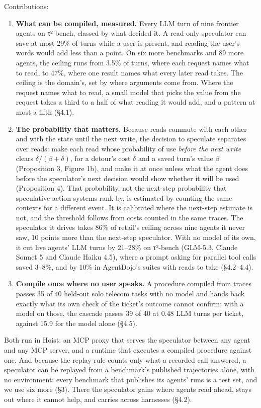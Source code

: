 \documentclass[10pt,twocolumn,letterpaper]{article}
\providecommand{\tightlist}{\setlength{\itemsep}{0pt}\setlength{\parskip}{0pt}}
\newcommand{\runin}[1]{{\sffamily\bfseries\color{accent}#1}}
\begin{document}
Contributions:

\begin{enumerate}
\def\labelenumi{\arabic{enumi}.}
\tightlist
\item
  \runin{What can be compiled, measured.} Every LLM turn of nine frontier agents on τ²-bench, classed by what decided it. A read-only speculator can save at most 29\% of turns while a user is present, and reading the user's words would add less than a point. On six more benchmarks and 89 more agents, the ceiling runs from 3.5\% of turns, where each request names what to read, to 47\%, where one result names what every later read takes. The ceiling is the domain's, set by where arguments come from. Where the request names what to read, a small model that picks the value from the request takes a third to a half of what reading it would add, and a pattern at most a fifth (§4.1).
\item
  \runin{The probability that matters.} Because reads commute with each other and with the state until the next write, the decision to speculate separates over reads: make each read whose probability of use \emph{before the next write} clears \(\delta/(\beta+\delta)\), for a detour's cost \(\delta\) and a saved turn's value \(\beta\) (Proposition 3, Figure 1b), and make it at once unless what the agent does before the speculator's next decision would show whether it will be used (Proposition 4). That probability, not the next-step probability that speculative-action systems rank by, is estimated by counting the same contexts for a different event. It is calibrated where the next-step estimate is not, and the threshold follows from costs counted in the same traces. The speculator it drives takes 86\% of retail's ceiling across nine agents it never saw, 10 points more than the next-step speculator. With no model of its own, it cut live agents' LLM turns by 21--28\% on τ²-bench (GLM-5.3, Claude Sonnet 5 and Claude Haiku 4.5), where a prompt asking for parallel tool calls saved 3--8\%, and by 10\% in AgentDojo's suites with reads to take (§4.2--4.4).
\item
  \runin{Compile once where no user speaks.} A procedure compiled from traces passes 35 of 40 held-out solo telecom tasks with no model and hands back exactly what its own check of the ticket's outcome cannot confirm; with a model on those, the cascade passes 39 of 40 at 0.48 LLM turns per ticket, against 15.9 for the model alone (§4.5).
\end{enumerate}

Both run in Hoist: an MCP proxy that serves the speculator between any agent and any MCP server, and a runtime that executes a compiled procedure against one. And because the replay rule counts only what a recorded call answered, a speculator can be replayed from a benchmark's published trajectories alone, with no environment: every benchmark that publishes its agents' runs is a test set, and we use six more (§3). There the speculator gains where agents read ahead, stays out where it cannot help, and carries across harnesses (§4.2).
\end{document}
